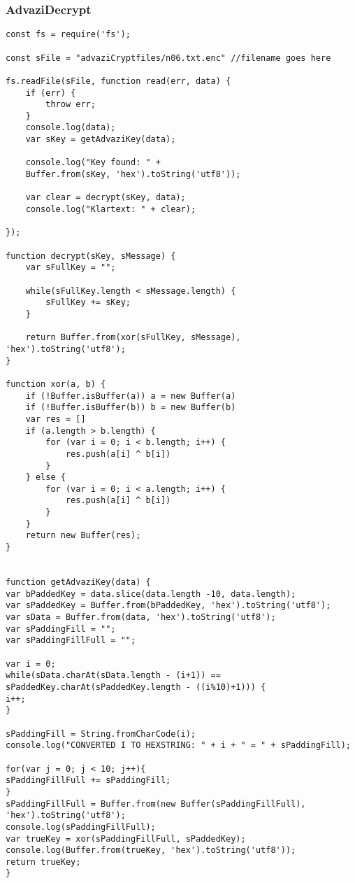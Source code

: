 \documentclass[12pt]{article}
\theoremstyle{plain}
\begin{document}
\subsubsection{AdvaziDecrypt}
\begin{lstlisting}
const fs = require('fs');

const sFile = "advaziCryptfiles/n06.txt.enc" //filename goes here

fs.readFile(sFile, function read(err, data) {
	if (err) {
		throw err;
	}
	console.log(data);
	var sKey = getAdvaziKey(data);

	console.log("Key found: " +
	Buffer.from(sKey, 'hex').toString('utf8'));

	var clear = decrypt(sKey, data);
	console.log("Klartext: " + clear);

});

function decrypt(sKey, sMessage) {
	var sFullKey = "";

	while(sFullKey.length < sMessage.length) {
		sFullKey += sKey;
	}

	return Buffer.from(xor(sFullKey, sMessage), 'hex').toString('utf8');
}

function xor(a, b) {
	if (!Buffer.isBuffer(a)) a = new Buffer(a)
	if (!Buffer.isBuffer(b)) b = new Buffer(b)
	var res = []
	if (a.length > b.length) {
		for (var i = 0; i < b.length; i++) {
			res.push(a[i] ^ b[i])
		}
	} else {
		for (var i = 0; i < a.length; i++) {
			res.push(a[i] ^ b[i])
		}
	}
	return new Buffer(res);
}


function getAdvaziKey(data) {
var bPaddedKey = data.slice(data.length -10, data.length);
var sPaddedKey = Buffer.from(bPaddedKey, 'hex').toString('utf8');
var sData = Buffer.from(data, 'hex').toString('utf8');
var sPaddingFill = "";
var sPaddingFillFull = "";

var i = 0;
while(sData.charAt(sData.length - (i+1)) == sPaddedKey.charAt(sPaddedKey.length - ((i%10)+1))) {
i++;
}

sPaddingFill = String.fromCharCode(i);
console.log("CONVERTED I TO HEXSTRING: " + i + " = " + sPaddingFill);

for(var j = 0; j < 10; j++){
sPaddingFillFull += sPaddingFill;
}
sPaddingFillFull = Buffer.from(new Buffer(sPaddingFillFull), 'hex').toString('utf8');
console.log(sPaddingFillFull);
var trueKey = xor(sPaddingFillFull, sPaddedKey);
console.log(Buffer.from(trueKey, 'hex').toString('utf8'));
return trueKey;
}

\end{lstlisting}
\end{document}
